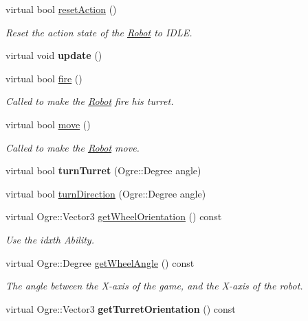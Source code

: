 \begin{DoxyCompactItemize}
\item 
virtual bool \hyperlink{class_robot_a6bc1ba7151313210f04584db866d45c8}{reset\+Action} ()\hypertarget{class_robot_a6bc1ba7151313210f04584db866d45c8}{}\label{class_robot_a6bc1ba7151313210f04584db866d45c8}

\begin{DoxyCompactList}\small\item\em Reset the action state of the \hyperlink{class_robot}{Robot} to I\+D\+LE. \end{DoxyCompactList}\item 
virtual void {\bfseries update} ()\hypertarget{class_robot_adc34eec22821c2dce23904a5ea75cf13}{}\label{class_robot_adc34eec22821c2dce23904a5ea75cf13}

\item 
virtual bool \hyperlink{class_robot_a23936e7872d4732a0f742e131cde0864}{fire} ()
\begin{DoxyCompactList}\small\item\em Called to make the \hyperlink{class_robot}{Robot} fire his turret. \end{DoxyCompactList}\item 
virtual bool \hyperlink{class_robot_a706f116e6359920401c07767d7d63989}{move} ()\hypertarget{class_robot_a706f116e6359920401c07767d7d63989}{}\label{class_robot_a706f116e6359920401c07767d7d63989}

\begin{DoxyCompactList}\small\item\em Called to make the \hyperlink{class_robot}{Robot} move. \end{DoxyCompactList}\item 
virtual bool {\bfseries turn\+Turret} (Ogre\+::\+Degree angle)\hypertarget{class_robot_ab5e2d0f15330edb713db220438a388ab}{}\label{class_robot_ab5e2d0f15330edb713db220438a388ab}

\item 
virtual bool \hyperlink{class_robot_a79904b8907071381b97c00931fe522b8}{turn\+Direction} (Ogre\+::\+Degree angle)
\item 
virtual Ogre\+::\+Vector3 \hyperlink{class_robot_ad4e340a0d2bd48d480ccfc8b9a0591ec}{get\+Wheel\+Orientation} () const 
\begin{DoxyCompactList}\small\item\em Use the idxth Ability. \end{DoxyCompactList}\item 
virtual Ogre\+::\+Degree \hyperlink{class_robot_ab3895f49d7d1ea4c3e753533dd95052e}{get\+Wheel\+Angle} () const 
\begin{DoxyCompactList}\small\item\em The angle between the X-\/axis of the game, and the X-\/axis of the robot. \end{DoxyCompactList}\item 
virtual Ogre\+::\+Vector3 {\bfseries get\+Turret\+Orientation} () const \hypertarget{class_robot_a6560036edc7677c03e26595bbd24c98e}{}\label{class_robot_a6560036edc7677c03e26595bbd24c98e}


\end{DoxyCompactItemize}
